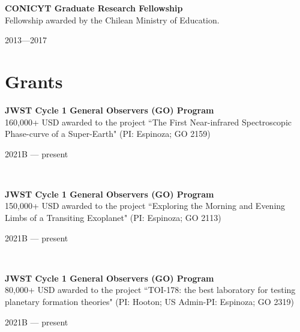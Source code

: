\documentclass[12pt, a4paper]{article} %
\begin{document}
\begin{minipage}[t]{0.7\textwidth}
\begin{flushleft}%
  \setlength{\leftskip}{0.2cm}%
\textbf{CONICYT Graduate Research Fellowship}\\
Fellowship awarded by the Chilean Ministry of Education.
\end{flushleft}
\end{minipage}
\begin{minipage}[t]{0.3\textwidth}
\hfill 2013---2017
\end{minipage}

\section*{Grants}

\begin{minipage}[t]{0.7\textwidth}
\begin{flushleft}%
  \setlength{\leftskip}{0.2cm}%
\textbf{JWST Cycle 1 General Observers (GO) Program}\\
160,000+ USD awarded to the project ``The First Near-infrared Spectroscopic Phase-curve of a Super-Earth" (PI: Espinoza; GO 2159)
\end{flushleft}
\end{minipage}
\begin{minipage}[t]{0.3\textwidth}
\hfill 2021B --- present
\end{minipage}\\

\begin{minipage}[t]{0.7\textwidth}
\begin{flushleft}%
  \setlength{\leftskip}{0.2cm}%
\textbf{JWST Cycle 1 General Observers (GO) Program}\\
150,000+ USD awarded to the project ``Exploring the Morning and Evening Limbs of a Transiting Exoplanet" (PI: Espinoza; GO 2113)
\end{flushleft}
\end{minipage}
\begin{minipage}[t]{0.3\textwidth}
\hfill 2021B --- present
\end{minipage}\\

\begin{minipage}[t]{0.7\textwidth}
\begin{flushleft}%
  \setlength{\leftskip}{0.2cm}%
\textbf{JWST Cycle 1 General Observers (GO) Program}\\
80,000+ USD awarded to the project ``TOI-178: the best laboratory for testing planetary formation theories" (PI: Hooton; US Admin-PI: Espinoza; GO 2319)
\end{flushleft}
\end{minipage}
\begin{minipage}[t]{0.3\textwidth}
\hfill 2021B --- present
\end{minipage}\\
\end{document}
